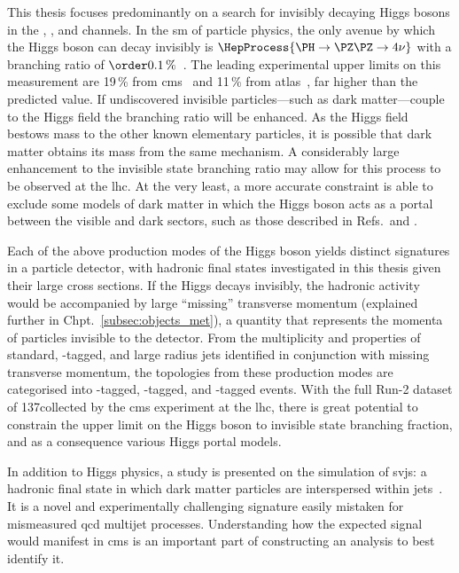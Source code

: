 This thesis focuses predominantly on a search for invisibly decaying Higgs bosons in the \ttH, \VH, and \ggH channels. In the \acrlong{sm} of particle physics, the only avenue by which the Higgs boson can decay invisibly is $\HepProcess{\PH \to \PZ\PZ \to \text{4}\nu}$ with a branching ratio of $\order{\text{0.1\,\%}}$~\cite{Heinemeyer:1559921}. The leading experimental upper limits on this measurement are 19\,\% from \acrshort{cms}~\cite{Sirunyan:2018owy} and 11\,\% from \acrshort{atlas}~\cite{ATLAS:2020kdi}, far higher than the predicted value. If undiscovered invisible particles---such as dark matter---couple to the Higgs field the branching ratio will be enhanced. As the Higgs field bestows mass to the other known elementary particles, it is possible that dark matter obtains its mass from the same mechanism. A considerably large enhancement to the invisible state branching ratio may allow for this process to be observed at the \acrshort{lhc}. At the very least, a more accurate constraint is able to exclude some models of dark matter in which the Higgs boson acts as a portal between the visible and dark sectors, such as those described in Refs.~and .

Each of the above production modes of the Higgs boson yields distinct signatures in a particle detector, with hadronic final states investigated in this thesis given their large cross sections. If the Higgs decays invisibly, the hadronic activity would be accompanied by large ``missing'' transverse momentum (explained further in Chpt.~\ref{subsec:objects_met}), a quantity that represents the momenta of particles invisible to the detector. From the multiplicity and properties of standard, \Pqb-tagged, and large radius \glspl{jet} identified in conjunction with missing transverse momentum, the topologies from these production modes are categorised into \ttH-tagged, \VH-tagged, and \ggH-tagged events. With the full Run-2 dataset of 137\fbinv collected by the \acrshort{cms} experiment at the \acrshort{lhc}, there is great potential to constrain the upper limit on the Higgs boson to invisible state branching fraction, and as a consequence various Higgs portal models.

In addition to Higgs physics, a study is presented on the simulation of \glspl{svj}: a hadronic final state in which dark matter particles are interspersed within \glspl{jet}~\cite{Cohen:2015toa,Cohen:2017pzm}. It is a novel and experimentally challenging signature easily mistaken for mismeasured \acrshort{qcd} multijet processes. Understanding how the expected signal would manifest in \acrshort{cms} is an important part of constructing an analysis to best identify it.

